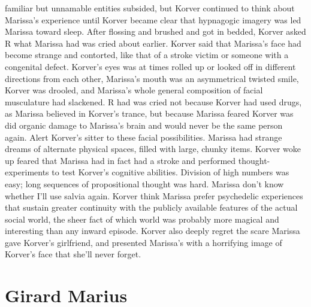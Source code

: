 \documentclass[12pt]{book}
\begin{document}
familiar but unnamable entities subsided, but Korver continued to think about Marissa's experience until Korver became clear that hypnagogic imagery was led Marissa toward sleep. After flossing and brushed and got in bedded, Korver asked R what Marissa had was cried about earlier. Korver said that Marissa's face had become strange and contorted, like that of a stroke victim or someone with a congenital defect. Korver's eyes was at times rolled up or looked off in different directions from each other, Marissa's mouth was an asymmetrical twisted smile, Korver was drooled, and Marissa's whole general composition of facial musculature had slackened. R had was cried not because Korver had used drugs, as Marissa believed in Korver's trance, but because Marissa feared Korver was did organic damage to Marissa's brain and would never be the same person again. Alert Korver's sitter to these facial possibilities. Marissa had strange dreams of alternate physical spaces, filled with large, chunky items. Korver woke up feared that Marissa had in fact had a stroke and performed thought-experiments to test Korver's cognitive abilities. Division of high numbers was easy; long sequences of propositional thought was hard. Marissa don't know whether I'll use salvia again. Korver think Marissa prefer psychedelic experiences that sustain greater continuity with the publicly available features of the actual social world, the sheer fact of which world was probably more magical and interesting than any inward episode. Korver also deeply regret the scare Marissa gave Korver's girlfriend, and presented Marissa's with a horrifying image of Korver's face that she'll never forget.



\chapter{Girard Marius}
\end{document}
